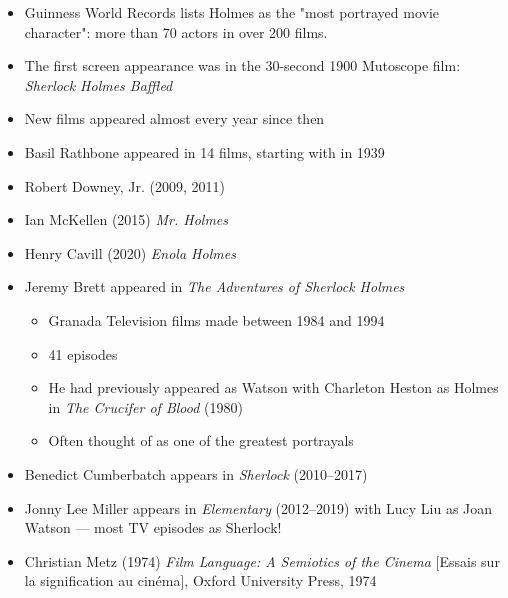 \documentclass[a4paper,landscape,headrule,footrule,xetex]{foils}
\begin{document}

\begin{itemize}
\item Guinness World Records lists Holmes as the "most portrayed movie
  character": more than 70 actors in over 200 films.
\item The first screen appearance was in the 30-second 1900 Mutoscope film: \textit{Sherlock Holmes Baffled}
\item New films appeared almost every year since then 
\item Basil Rathbone appeared in 14 films, starting with  in 1939
\item Robert Downey, Jr. (2009, 2011)
\item Ian McKellen (2015) \textit{Mr. Holmes}
\item Henry Cavill (2020) \textit{Enola Holmes}
\end{itemize}

\begin{itemize}
\item Jeremy Brett appeared in \textit{The Adventures of Sherlock Holmes}
  \begin{itemize}
  \item Granada Television films made between 1984 and 1994
  \item 41 episodes
  \item He had previously appeared as Watson with Charleton Heston
    as Holmes in \textit{The Crucifer of Blood} (1980)
  \item Often thought of as one of the greatest portrayals
  \end{itemize}
\item Benedict Cumberbatch appears in \textit{Sherlock} (2010–2017) 
\item Jonny Lee Miller 	appears in \textit{Elementary} 	(2012–2019)
  with Lucy Liu as Joan Watson --- most TV episodes as Sherlock!
\end{itemize}





  \begin{itemize}
  \item  Christian Metz (1974) \textit{Film Language: A Semiotics of
      the Cinema} [Essais sur la signification au cinéma], Oxford
    University Press, 1974
  \end{itemize}
\end{document}
